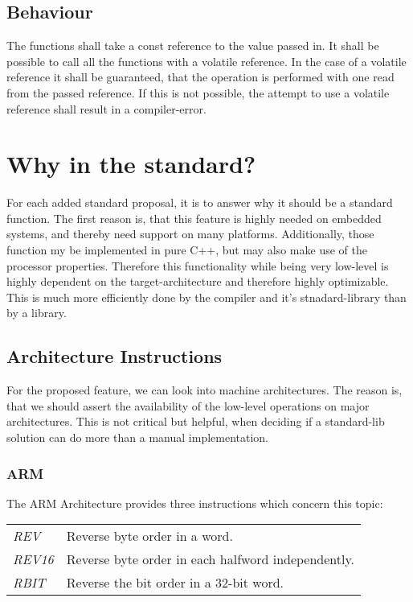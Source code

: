 \documentclass{article}
\begin{document}
\subsection{Behaviour}
The functions shall take a const reference to the value passed in.
It shall be possible to call all the functions with a volatile reference. In the
case of a volatile reference it shall be guaranteed, that the operation is
performed with one read from the passed reference. If this is not possible, the
attempt to use a volatile reference shall result in a compiler-error.
\section{Why in the standard?}
For each added standard proposal, it is to answer why it should be a standard
function. The first reason is, that this feature is highly needed on embedded
systems, and thereby need support on many platforms.
Additionally, those function my be implemented in pure C++, but may also make
use of the processor properties.  Therefore this functionality while being very
low-level is highly dependent on the target-architecture and therefore highly
optimizable. This is much more efficiently done by the compiler and it's
stnadard-library than by a library.

\subsection{Architecture Instructions}
For the proposed feature, we can look into machine architectures. The
reason is, that we should assert the availability of the low-level operations on
major architectures. This is not critical but helpful, when deciding if a
standard-lib solution can do more than a manual implementation.
\subsubsection{ARM}
The ARM Architecture provides three instructions which concern this topic:\\

\begin{tabular}{l | l}
  \textit {REV} & Reverse byte order in a word.\\ 
  \textit {REV16} & Reverse byte order in each halfword
  independently.\\
  \textit {RBIT} & Reverse the bit order in a 32-bit word.
\end{tabular}\\
\end{document}
